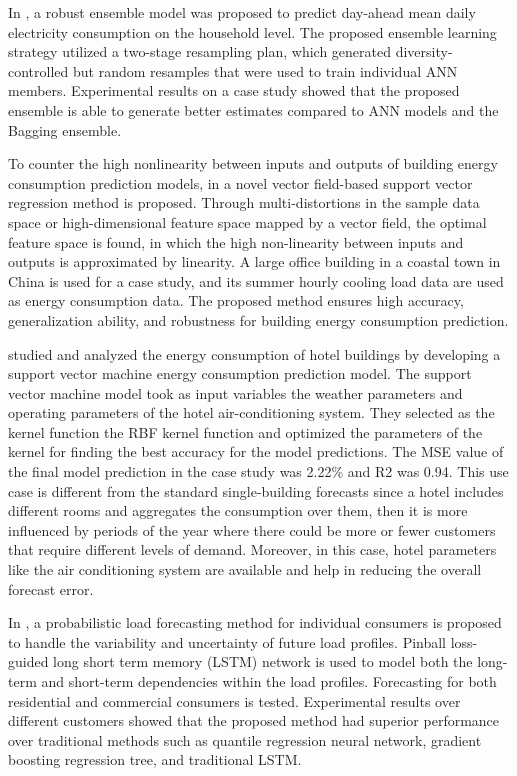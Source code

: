 In \cite{ALOBAIDI2018997}, a robust ensemble model was proposed to predict day-ahead mean daily electricity consumption on the household level.
The proposed ensemble learning strategy utilized a two-stage resampling plan, which generated diversity-controlled but random resamples that were used to train individual ANN members.
Experimental results on a case study showed that the proposed ensemble is able to generate better estimates compared to ANN models and the Bagging ensemble.

To counter the high nonlinearity between inputs and outputs of building energy consumption prediction models, in \cite{ZHONG2019403} a novel vector field-based support vector regression method is proposed.
Through multi-distortions in the sample data space or high-dimensional feature space mapped by a vector field, the optimal feature space is found, in which the high non-linearity between inputs and outputs is approximated by linearity.
A large office building in a coastal town in China is used for a case study, and its summer hourly cooling load data are used as energy consumption data.
The proposed method ensures high accuracy, generalization ability, and robustness for building energy consumption prediction.

\cite{SHAO2020102128} studied and analyzed the energy consumption of hotel buildings by developing a support vector machine energy consumption prediction model.
The support vector machine model took as input variables the weather parameters and operating parameters of the hotel air-conditioning system.
They selected as the kernel function the RBF kernel function and optimized the parameters of the kernel for finding the best accuracy for the model predictions.
The MSE value of the final model prediction in the case study was 2.22\% and R2 was 0.94.
This use case is different from the standard single-building forecasts since a hotel includes different rooms and aggregates the consumption over them, then it is more influenced by periods of the year where there could be more or fewer customers that require different levels of demand.
Moreover, in this case, hotel parameters like the air conditioning system are available and help in reducing the overall forecast error.

In \cite{WANG201910}, a probabilistic load forecasting method for individual consumers is proposed to handle the variability and uncertainty of future load profiles.
Pinball loss-guided long short term memory (LSTM) network is used to model both the long-term and short-term dependencies within the load profiles.
Forecasting for both residential and commercial consumers is tested.
Experimental results over different customers showed that the proposed method had superior performance over traditional methods such as quantile regression neural network, gradient boosting regression tree, and traditional LSTM.

